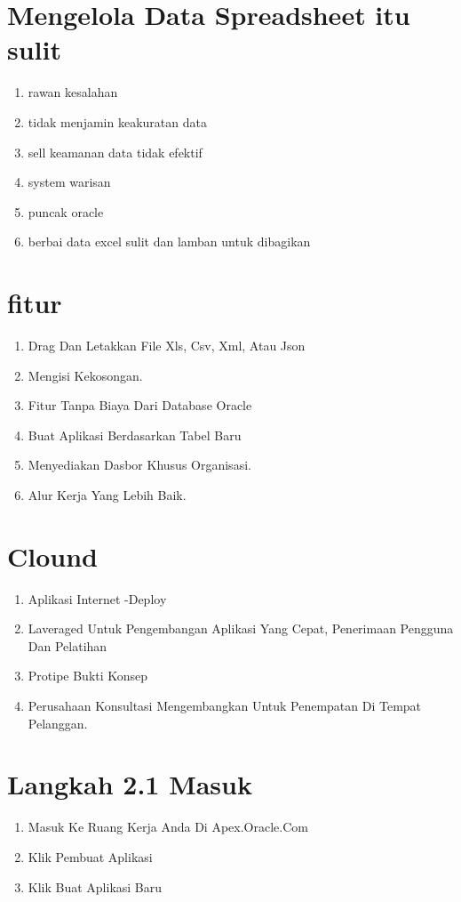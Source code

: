 \documentclass{article}
\begin{document}
\section{Mengelola Data Spreadsheet itu sulit}
\begin{enumerate}
\item rawan kesalahan
\item tidak menjamin keakuratan data
\item sell keamanan data tidak efektif
\item system warisan
\item puncak oracle
\item berbai data excel sulit dan lamban untuk dibagikan
\end{enumerate}

\section{fitur}
\begin{enumerate}
\item  Drag Dan Letakkan File Xls, Csv, Xml, Atau Json
\item Mengisi Kekosongan.
\item  Fitur Tanpa Biaya Dari Database Oracle
\item  Buat Aplikasi Berdasarkan Tabel Baru
\item Menyediakan Dasbor Khusus Organisasi.
\item Alur Kerja Yang Lebih Baik.

\end{enumerate}

\section{ Clound}
\begin{enumerate}
    \item Aplikasi Internet -Deploy
    \item  Laveraged Untuk Pengembangan Aplikasi Yang Cepat, Penerimaan Pengguna Dan Pelatihan
    \item Protipe Bukti Konsep
    \item Perusahaan Konsultasi Mengembangkan Untuk Penempatan Di Tempat
Pelanggan.

\end{enumerate}

\section{ Langkah 2.1 Masuk}
\begin{enumerate}
    \item Masuk Ke Ruang Kerja Anda Di Apex.Oracle.Com
    \item  Klik Pembuat Aplikasi
    \item Klik Buat Aplikasi Baru

\end{enumerate}
\end{document}
